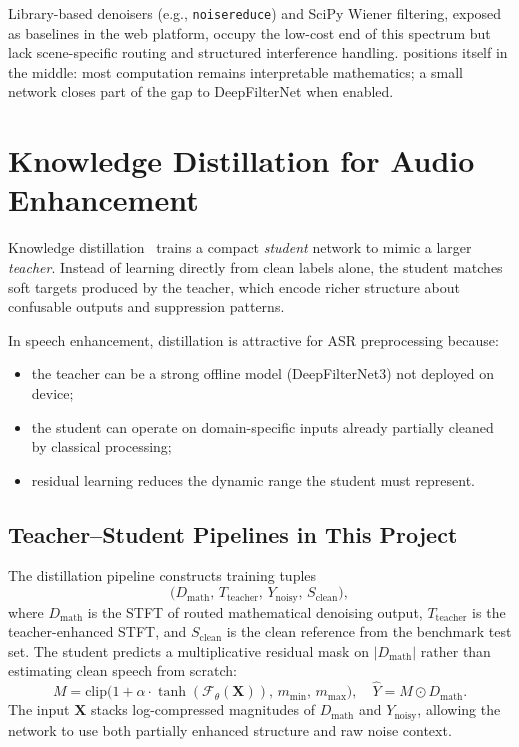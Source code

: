 Library-based denoisers (e.g., \texttt{noisereduce}) and SciPy Wiener filtering, exposed as baselines in the web platform, occupy the low-cost end of this spectrum but lack scene-specific routing and structured interference handling. \projectshort{} positions itself in the middle: most computation remains interpretable mathematics; a small network closes part of the gap to DeepFilterNet when enabled.

\section{Knowledge Distillation for Audio Enhancement}
\label{sec:distillation}

Knowledge distillation~\cite{hintondistill2015} trains a compact \emph{student} network to mimic a larger \emph{teacher}. Instead of learning directly from clean labels alone, the student matches soft targets produced by the teacher, which encode richer structure about confusable outputs and suppression patterns.

In speech enhancement, distillation is attractive for ASR preprocessing because:
\begin{itemize}
  \item the teacher can be a strong offline model (DeepFilterNet3) not deployed on device;
  \item the student can operate on domain-specific inputs already partially cleaned by classical processing;
  \item residual learning reduces the dynamic range the student must represent.
\end{itemize}

\subsection{Teacher--Student Pipelines in This Project}

The \projectshort{} distillation pipeline constructs training tuples
\[
  \bigl(D_{\mathrm{math}},\, T_{\mathrm{teacher}},\, Y_{\mathrm{noisy}},\, S_{\mathrm{clean}}\bigr),
\]
where $D_{\mathrm{math}}$ is the STFT of routed mathematical denoising output, $T_{\mathrm{teacher}}$ is the teacher-enhanced STFT, and $S_{\mathrm{clean}}$ is the clean reference from the benchmark test set. The student predicts a multiplicative residual mask on $\lvert D_{\mathrm{math}}\rvert$ rather than estimating clean speech from scratch:
\begin{equation}
  M = \mathrm{clip}\bigl(1 + \alpha \cdot \tanh(\mathcal{F}_\theta(\mathbf{X})),\, m_{\min},\, m_{\max}\bigr), \quad
  \hat{Y} = M \odot D_{\mathrm{math}}.
\end{equation}
The input $\mathbf{X}$ stacks log-compressed magnitudes of $D_{\mathrm{math}}$ and $Y_{\mathrm{noisy}}$, allowing the network to use both partially enhanced structure and raw noise context.


